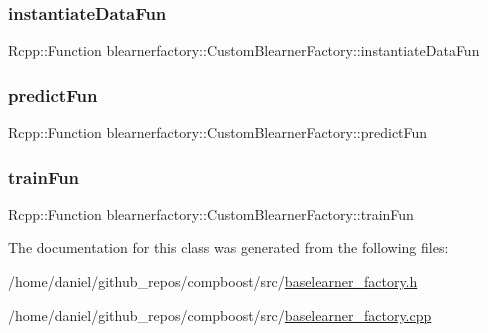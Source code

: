 \subsubsection{\texorpdfstring{instantiate\+Data\+Fun}{instantiateDataFun}}
{\footnotesize\ttfamily Rcpp\+::\+Function blearnerfactory\+::\+Custom\+Blearner\+Factory\+::instantiate\+Data\+Fun\hspace{0.3cm}{\ttfamily [private]}}

\mbox{\label{classblearnerfactory_1_1_custom_blearner_factory_a6cf80331e6ce5d8cabb25d7af09f9eea}} 
\subsubsection{\texorpdfstring{predict\+Fun}{predictFun}}
{\footnotesize\ttfamily Rcpp\+::\+Function blearnerfactory\+::\+Custom\+Blearner\+Factory\+::predict\+Fun\hspace{0.3cm}{\ttfamily [private]}}

\mbox{\label{classblearnerfactory_1_1_custom_blearner_factory_ac342da04b06c4e707811e4b312ce6c61}} 
\subsubsection{\texorpdfstring{train\+Fun}{trainFun}}
{\footnotesize\ttfamily Rcpp\+::\+Function blearnerfactory\+::\+Custom\+Blearner\+Factory\+::train\+Fun\hspace{0.3cm}{\ttfamily [private]}}



The documentation for this class was generated from the following files\+:\begin{DoxyCompactItemize}
\item 
/home/daniel/github\+\_\+repos/compboost/src/\hyperlink{baselearner__factory_8h}{baselearner\+\_\+factory.\+h}\item 
/home/daniel/github\+\_\+repos/compboost/src/\hyperlink{baselearner__factory_8cpp}{baselearner\+\_\+factory.\+cpp}\end{DoxyCompactItemize}
